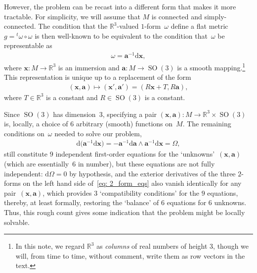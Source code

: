 \documentclass[pdftex]{sigma}
\numberwithin{equation}{section}
\renewcommand{\d}{\mathrm{d}}%
\newcommand{\SO}{\operatorname{SO}}
\newcommand{\mba}{\mathbf{a}}
\newcommand{\mbx}{\mathbf{x}}
\begin{document}
However, the problem can be recast into a different form that makes it more tractable. For simplicity, we will assume that $M$ is connected and simply-connected. The condition that the $\mathbb{R}^3$-valued $1$-form~$\omega$ define a flat metric $g = {}^t\omega \circ \omega$ is then well-known to be equivalent to the condition that~$\omega$
be representable as
\begin{gather*}
\omega = \mba^{-1} \d \mbx,
\end{gather*}
where $\mbx\colon M\to\mathbb{R}^3$ is an immersion and $\mba\colon M\to\SO(3)$ is a smooth mapping.\footnote{In this note, we regard $\mathbb{R}^3$ as \emph{columns}
of real numbers of height $3$, though we will, from time to time, without comment, write them as row vectors in the text.}
This representation is unique up to a replacement of the form
\begin{gather*}
(\mbx,\mba)\mapsto (\mbx',\mba') = (R\mbx + T, R\mba),
\end{gather*}
where $T\in\mathbb{R}^3$ is a constant and $R\in\SO(3)$ is a constant.

Since $\SO(3)$ has dimension~$3$, specifying a pair $(\mbx,\mba)\colon M\to\mathbb{R}^3\times\SO(3)$ is, locally, a choice of $6$ arbitrary (smooth) functions on~$M$.
The remaining conditions on~$\omega$ needed to solve our problem,
\begin{gather}\label{eq: 2_form_eqs}
\d\big(\mba^{-1} \d \mbx\big) = -\mba^{-1} \d \mba \wedge \mba^{-1} \d \mbx = \Omega,
\end{gather}
still constitute $9$ independent first-order equations
for the `unknowns'~$(\mbx,\mba)$ (which are essentially~$6$ in number),
but these equations are not fully independent:
 $\d\Omega=0$ by hypothesis,
and the exterior derivatives of the three $2$-forms
on the left hand side of~\eqref{eq: 2_form_eqs}
also vanish identically for any pair~$(\mbx,\mba)$,
which provides $3$ `compatibility conditions' for the $9$ equations,
thereby, at least formally,
restoring the `balance' of $6$ equations for $6$ unknowns.
Thus, this rough count gives some indication that the problem might
be locally solvable.
\end{document}
